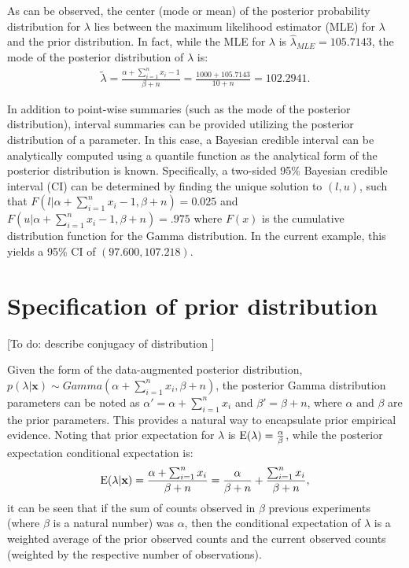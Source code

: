\begin{DoubleSpace*}
As can be observed, the center (mode or mean) of the posterior probability distribution for $\lambda$ lies between the maximum likelihood estimator (MLE) for $\lambda$ and the prior distribution. In fact, while the MLE for $\lambda$ is $\hat{\lambda}_{MLE}=105.7143$, the mode of the posterior distribution of $\lambda$ is:
\begin{align*}
	\tilde{\lambda} = \frac{\alpha+ \sum_{i=1}^n x_i -1}{\beta+n} =\frac{1000+105.7143}{10+n} = 102.2941.
\end{align*}

In addition to point-wise summaries (such as the mode of the posterior distribution), interval summaries can be provided utilizing the posterior distribution of a parameter. In this case, a Bayesian credible interval \cite{gelman2004} can be analytically computed using a quantile function as the analytical form of the posterior distribution is known. Specifically, a two-sided 95\% Bayesian credible interval (CI) can be determined by finding the unique solution to $(l,u)$, such that $F(l|\alpha+ \sum_{i=1}^n x_i -1,\beta+n)=0.025$ and $F(u|\alpha+ \sum_{i=1}^n x_i -1,\beta+n)=.975$ where $F(x)$ is the cumulative distribution function for the Gamma distribution. In the current example, this yields a 95\% CI of $(97.600, 107.218)$.
 
\section{Specification of prior distribution}
[To do: describe conjugacy of distribution ]

Given the form of the data-augmented posterior distribution, $p(\lambda|\textbf{x})\sim Gamma(\alpha+ \sum_{i=1}^n x_i, \beta+n)$,  the posterior Gamma distribution parameters can be noted as $\alpha'=\alpha+ \sum_{i=1}^n x_i$ and $\beta'=\beta+n$, where $\alpha$ and $\beta$ are the prior parameters. This provides a natural way to encapsulate prior empirical evidence. Noting that prior expectation for $\lambda$ is $\operatorname{E}(\lambda)=\frac{\alpha}{\beta}$, while the posterior expectation conditional expectation is:
\begin{align}
	\operatorname{E}(\lambda|\textbf{x})=\frac{\alpha+ \sum_{i=1}^n x_i}{\beta+n} =\frac{\alpha}{\beta+n}+\frac{\sum_{i=1}^n x_i}{\beta+n},
\end{align} it can be seen that if the sum of counts observed in $\beta$ previous experiments (where $\beta$ is a natural number) was $\alpha$, then the conditional expectation of $\lambda$ is a weighted average of the prior observed counts and the current observed counts (weighted by the respective number of observations). 


\end{DoubleSpace*}
